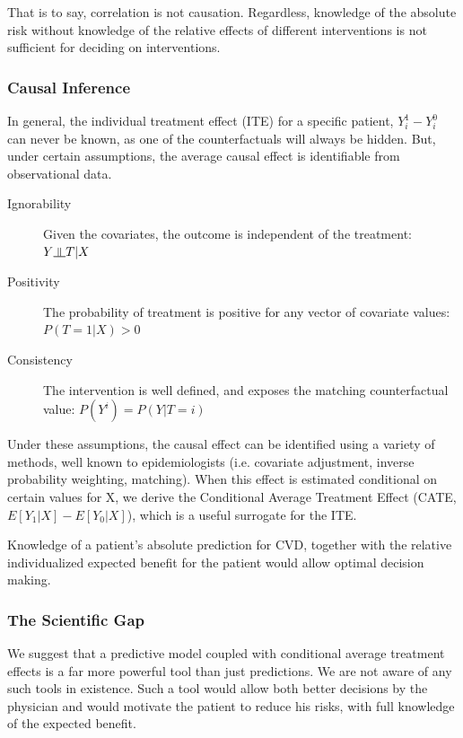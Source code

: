 \documentclass[a4paper,12pt]{article}
\newcommand{\indep}{\rotatebox[origin=c]{90}{$\models$}}
\begin{document}
			That is to say, correlation is not causation. Regardless, knowledge of the absolute risk without knowledge of the relative effects of different interventions is not sufficient for deciding on interventions.
			
			\subsubsection{Causal Inference}
			In general, the individual treatment effect (ITE) for a specific patient, $ Y_i^1 - Y_i^0 $ can never be known, as one of the counterfactuals will always be hidden. But, under certain assumptions, the average causal effect is identifiable from observational data.
			\begin{description}
				\item[Ignorability] Given the covariates, the outcome is independent of the treatment: $ Y \indep  T | X$
				\item[Positivity] The probability of treatment is positive for any vector of covariate values: $ P(T = 1|X) > 0 $
				\item[Consistency] The intervention is well defined, and exposes the matching counterfactual value: $ P(Y^i) = P(Y|T=i) $
			\end{description}
		
			Under these assumptions, the causal effect can be identified using a variety of methods, well known to epidemiologists (i.e. covariate adjustment, inverse probability weighting, matching). When this effect is estimated conditional on certain values for X, we derive the Conditional Average Treatment Effect (CATE, $ E[Y_1|X] - E[Y_0|X] $), which is a useful surrogate for the ITE.
			
			Knowledge of a patient's absolute prediction for CVD, together with the relative individualized expected benefit for the patient would allow optimal decision making.
			
			\subsubsection{The Scientific Gap}
			
			We suggest that a predictive model coupled with conditional average treatment effects is a far more powerful tool than just predictions. We are not aware of any such tools in existence. Such a tool would allow both better decisions by the physician and would motivate the patient to reduce his risks, with full knowledge of the expected benefit.
			
\end{document}

